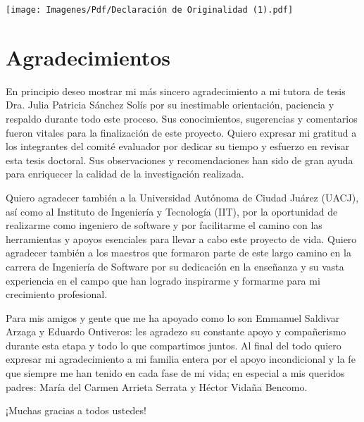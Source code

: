 \documentclass[final, fmstyle, 12pt]{article}
\begin{document}
\begin{center}
\texttt{[image: Imagenes/Pdf/Declaración de Originalidad (1).pdf]}

\end{center}


\newpage
\section{Agradecimientos}
\setlength{\parskip}{1em}
En principio deseo mostrar mi más sincero agradecimiento a mi tutora de tesis Dra. Julia Patricia Sánchez Solís por su inestimable orientación, paciencia y respaldo durante todo este proceso. Sus conocimientos, sugerencias y comentarios fueron vitales para la finalización de este proyecto.
Quiero expresar mi gratitud a los integrantes del comité evaluador por dedicar su tiempo y esfuerzo en revisar esta tesis doctoral. Sus observaciones y recomendaciones han sido de gran ayuda para enriquecer la calidad de la investigación realizada.

Quiero agradecer también a la Universidad Autónoma de Ciudad Juárez (UACJ), así como al Instituto de Ingeniería y Tecnología (IIT), por la oportunidad de realizarme como ingeniero de software y por facilitarme el camino con las herramientas y apoyos esenciales para llevar a cabo este proyecto de vida.
Quiero agradecer también a los maestros que formaron parte de este largo camino en la carrera de Ingeniería de Software por su dedicación en la enseñanza y su vasta experiencia en el campo que han logrado inspirarme y formarme para mi crecimiento profesional.

Para mis amigos y gente que me ha apoyado como lo son Emmanuel Saldivar Arzaga y Eduardo Ontiveros: les agradezo su constante apoyo y compañerismo durante esta etapa y todo lo que compartimos juntos.
Al final del todo quiero expresar mi agradecimiento a mi familia entera por el apoyo incondicional y la fe que siempre me han tenido en cada fase de mi vida; en especial a mis queridos padres: María del Carmen Arrieta Serrata y Héctor Vidaña Bencomo.




¡Muchas gracias a todos ustedes!
\newpage
\end{document}
